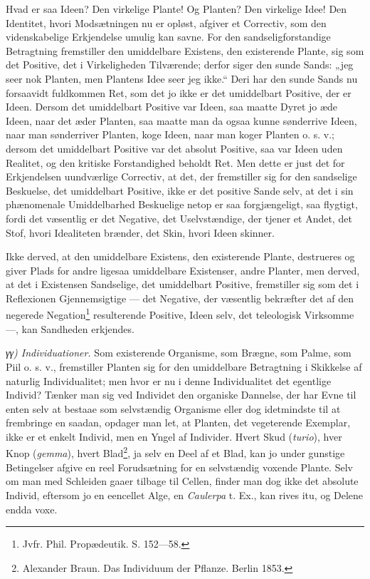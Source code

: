 \documentclass[12pt,a4paper]{book}
\begin{document}
Hvad er saa Ideen? Den virkelige Plante! Og Planten? Den virkelige Idee! Den
Identitet, hvori Modsætningen nu er opløst, afgiver et Correctiv, som den
videnskabelige Erkjendelse umulig kan savne. For den sandseligforstandige
Betragtning fremstiller den umiddelbare Existens, den existerende Plante, sig
som det Positive, det i Virkeligheden Tilværende; derfor siger den sunde Sands:
„jeg seer nok Planten, men Plantens Idee seer jeg ikke.“ Deri har den sunde
Sands nu forsaavidt fuldkommen Ret, som det jo ikke er
\setcounter{footnote}{0}
det umiddelbart Positive, der er Ideen. Dersom det umiddelbart Positive var
Ideen, saa maatte Dyret jo æde Ideen, naar det æder Planten, saa maatte man da
ogsaa kunne sønderrive Ideen, naar man sønderriver Planten, koge Ideen, naar
man koger Planten o. s. v.; dersom det umiddelbart Positive var det absolut
Positive, saa var Ideen uden Realitet, og den kritiske Forstandighed beholdt
Ret. Men dette er just det for Erkjendelsen uundværlige Correctiv, at det, der
fremstiller sig for den sandselige Beskuelse, det umiddelbart Positive, ikke er
det positive Sande selv, at det i sin phænomenale Umiddelbarhed Beskuelige
netop er saa forgjængeligt, saa flygtigt, fordi det væsentlig er det Negative,
det Uselvstændige, der tjener et Andet, det Stof, hvori Idealiteten brænder,
det Skin, hvori Ideen skinner.

Ikke derved, at den umiddelbare Existens, den existerende Plante, destrueres og
giver Plads for andre ligesaa umiddelbare Existenser, andre Planter, men
derved, at det i Existensen Sandselige, det umiddelbart Positive, fremstiller
sig som det i Reflexionen Gjennemsigtige --- det Negative, der væsentlig
bekræfter det af den negerede Negation\footnote{Jvfr. Phil. Propædeutik.
S. 152---58.} resulterende Positive, Ideen selv, det teleologisk Virksomme ---,
kan Sandheden erkjendes.

\emph{γγ) Individuationer.} Som existerende Organisme, som Brægne, som Palme,
som Piil o. s. v., fremstiller Planten sig for den umiddelbare Betragtning i
Skikkelse af naturlig Individualitet; men hvor er nu i denne Individualitet det
egentlige Individ? Tænker man sig ved Individet den organiske Dannelse, der har
Evne til enten selv at bestaae som selvstændig Organisme eller dog idetmindste
til at frembringe en saadan, opdager man let, at Planten, det vegeterende
Exemplar, ikke er et enkelt Individ, men en Yngel
\setcounter{footnote}{0}
af Individer. Hvert Skud (\textit{turio}), hver Knop (\textit{gemma}), hvert
Blad\footnote{Alexander Braun. Das Individuum der Pflanze. Berlin 1853.}, ja
selv en Deel af et Blad, kan jo under gunstige Betingelser afgive en reel
Forudsætning for en selvstændig voxende Plante. Selv om man med Schleiden gaaer
tilbage til Cellen, finder man dog ikke det absolute Individ, eftersom jo en
eencellet Alge, en \textit{Caulerpa} t. Ex., kan rives itu, og Delene endda
voxe.
\end{document}

